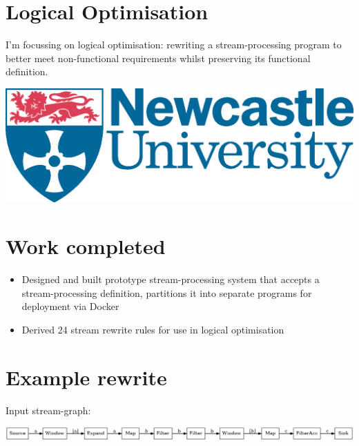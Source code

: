 \documentclass[a1paper,fleqn]{betterposter}
\begin{document}
{\section{Logical Optimisation}

I'm focussing on logical optimisation:
rewriting a stream-processing program to
better meet non-functional requirements whilst preserving its functional
definition.

\vfill

\includegraphics[width=\textwidth]{img/logo}\\

}{

\section{Work completed}

\begin{itemize}
    \item Designed and built prototype stream-processing system
        that accepts a stream-processing definition, partitions
        it into separate programs for deployment via Docker

    \item Derived 24 stream rewrite rules
        for use in logical optimisation

\end{itemize}

\section{Example rewrite}

Input stream-graph:

\begin{center}
\includegraphics[width=\textwidth]{img/before}
\end{center}

}
\end{document}
